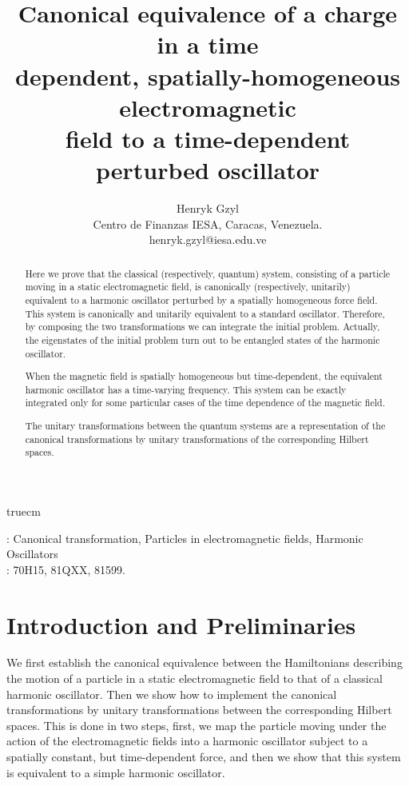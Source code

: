 \documentclass[12pt]{article}
\numberwithin{equation}{section}
\begin{document}
\title{Canonical equivalence of a charge in a time\\dependent, spatially-homogeneous electromagnetic\\ field to a time-dependent perturbed oscillator}
\author{Henryk Gzyl\\
Centro de Finanzas IESA, Caracas, Venezuela.\\
 henryk.gzyl@iesa.edu.ve}
\date{}
 \maketitle

\setlength{\textwidth}{4in}

 truecm
 \baselineskip \setlength{\textwidth}{6in}
\begin{abstract}
Here we prove that the classical (respectively, quantum) system, consisting of a particle moving in a static electromagnetic field, is canonically (respectively, unitarily) equivalent to a harmonic oscillator perturbed by a spatially homogeneous force field. This system is canonically and unitarily equivalent to a standard oscillator. Therefore, by composing the two transformations we can integrate the initial problem. Actually, the eigenstates of the initial problem turn out to be entangled states of the harmonic oscillator.

When the magnetic field is spatially homogeneous but time-dependent, the equivalent harmonic oscillator has a time-varying frequency. This system can be exactly integrated 
only for some particular cases of the time dependence of the magnetic field.

The unitary transformations between the quantum systems are a representation of the canonical transformations by unitary transformations of the corresponding Hilbert spaces.
\end{abstract}

: Canonical transformation, Particles in electromagnetic fields, Harmonic Oscillators   \\
: 70H15, 81QXX, 81599.


\section{Introduction and Preliminaries} 
We first establish the canonical equivalence between the Hamiltonians describing the motion of a particle in a static electromagnetic field to that of a classical harmonic oscillator. Then we show how to implement the canonical transformations by unitary transformations between the corresponding Hilbert spaces. This is done in two steps, first, we map the particle moving under the action of the electromagnetic fields into a harmonic oscillator subject to a spatially constant, but time-dependent force, and then we show that this system is equivalent to a simple harmonic oscillator.
\end{document}
